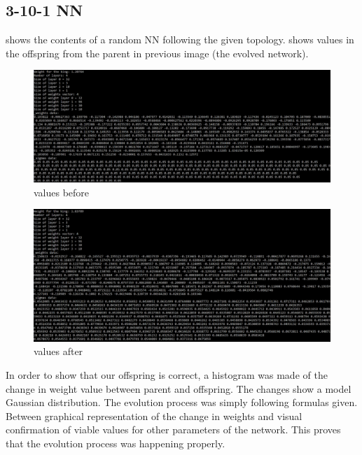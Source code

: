 \documentclass{article}
\begin{document}
\subsection{3-10-1 NN}
 shows the contents of a random
NN following the given topology.  shows values in the offspring from the
parent in previous image (the evolved network).

\begin{figure}
    \includegraphics[width=\linewidth]{images/3-10-1-before.png}
    \caption{values before}
    \label{fig:3-10-1-before}
\end{figure}

\begin{figure}
    \includegraphics[width=\linewidth]{images/3-10-1-after.png}
    \caption{values after}
    \label{fig:3-10-1-after}
\end{figure}

In order to show that our offspring is correct, a
histogram was made of the change in weight value between parent and offspring. The
changes show a model Gaussian distribution. The evolution process was simply following formulas
given. Between graphical representation of the change in weights and visual
confirmation of viable values for other parameters of the network. This proves that
the evolution process was happening properly.
\end{document}
